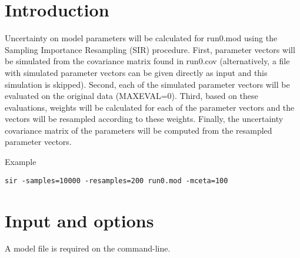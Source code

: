 



\maketitle


\section{Introduction}
Uncertainty on model parameters will be calculated for run0.mod using the Sampling Importance Resampling (SIR) procedure.
First, parameter vectors will be simulated from the covariance matrix found in run0.cov 
(alternatively, a file with simulated parameter vectors can be given directly as input and this simulation is skipped). 
Second, each of the simulated parameter vectors will be evaluated on the original data (MAXEVAL=0). 
Third, based on these evaluations, weights will be calculated for each of the parameter vectors and the vectors 
will be resampled according to these weights. Finally, the uncertainty covariance matrix of the parameters 
will be computed from the resampled parameter vectors.

Example
\begin{verbatim}
sir -samples=10000 -resamples=200 run0.mod -mceta=100
\end{verbatim}

\section{Input and options}
A model file is required on the command-line.

